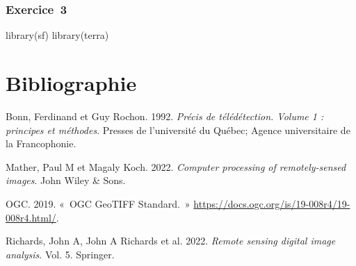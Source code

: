 \documentclass[
  letterpaper,
  DIV=11,
  numbers=noendperiod]{scrreprt}
\newenvironment{Shaded}{\begin{snugshade}}{\end{snugshade}}
\newcommand{\NormalTok}[1]{\textcolor[rgb]{0.00,0.23,0.31}{#1}}
\newlength{\cslhangindent}
\newenvironment{CSLReferences}[2] %
 {\begin{list}{}{%
  \setlength{\itemindent}{0pt}
  \setlength{\leftmargin}{0pt}
  \setlength{\parsep}{0pt}
  \ifodd #1
   \setlength{\leftmargin}{\cslhangindent}
   \setlength{\itemindent}{-1\cslhangindent}
  \fi
  \setlength{\itemsep}{#2\baselineskip}}}
 {\end{list}}
\begin{document}
\subsection{Exercice~3}\label{sec-08073}

\begin{Shaded}
\begin{Highlighting}[]
\NormalTok{library(sf)}
\NormalTok{library(terra)}
\end{Highlighting}
\end{Shaded}


\chapter*{Bibliographie}\label{bibliographie}


\label{refs}
\begin{CSLReferences}{1}{0}
Bonn, Ferdinand et Guy Rochon. 1992. \emph{Précis de télédétection.
Volume 1 : principes et méthodes}. Presses de l'université du Québec;
Agence universitaire de la Francophonie.

Mather, Paul M et Magaly Koch. 2022. \emph{Computer processing of
remotely-sensed images}. John Wiley \& Sons.

OGC. 2019. {«~{OGC GeoTIFF Standard}.~»}
\url{https://docs.ogc.org/is/19-008r4/19-008r4.html/}.

Richards, John A, John A Richards et al. 2022. \emph{Remote sensing
digital image analysis}. Vol. 5. Springer.

\end{CSLReferences}
\end{document}
